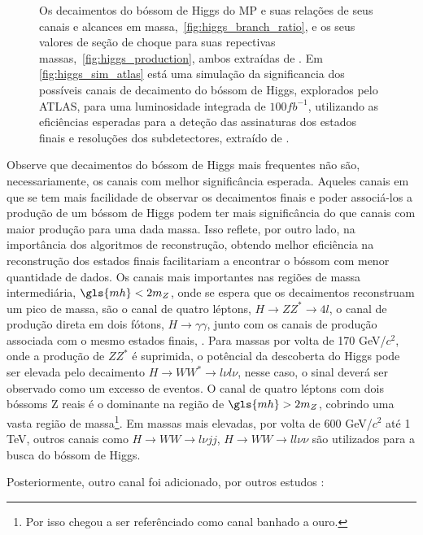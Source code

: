 \begin{figure}[ht!]
\begin{center}
{        }
    \end{center}
\caption[Simulação da significância dos canais de decaimento do bóssom
de Higgs explorados pelos ATLAS, as relações de seus canais e alcances em massa,
e a seção de choque do mesmo.]
{Os decaimentos do bóssom de Higgs do MP e suas relações de
seus canais e alcances em massa,~\ref{fig:higgs_branch_ratio}, e os seus valores de seção de choque para suas
repectivas massas,~\ref{fig:higgs_production}, ambos extraídas de \cite{lhc_higgs_group}. 
Em \ref{fig:higgs_sim_atlas} está uma simulação da significancia dos possíveis canais de decaimento do
bóssom de Higgs, explorados pelo ATLAS, para uma luminosidade integrada de
$100fb^{-1}$, utilizando as eficiências esperadas para a deteção das
assinaturas dos estados finais e resoluções dos subdetectores, extraído de
\cite{ATLAS_TDR2}.}
\end{figure}

Observe que decaimentos do bóssom de Higgs mais frequentes não são,
necessariamente, os canais com melhor significância esperada. Aqueles canais em
que se tem mais facilidade de observar os decaimentos finais e poder associá-los
a produção de um bóssom de Higgs podem ter mais significância do que canais com
maior produção para uma dada massa. Isso reflete, por outro lado, na importância
dos algoritmos de reconstrução, obtendo melhor eficiência na reconstrução dos
estados finais facilitariam a encontrar o bóssom com menor quantidade de dados.
Os canais mais importantes nas regiões de massa intermediária, $\gls{mh}<2m_Z$,
onde se espera que os decaimentos reconstruam um pico de massa, são 
o canal de quatro léptons, $H\rightarrow ZZ^* \rightarrow 4l$, o canal de
produção direta em dois fótons, $H\rightarrow \gamma\gamma$, junto com os
canais de produção associada com o mesmo estados finais, . Para massas por volta
de 170 GeV/$c^2$, onde a produção de $ZZ^*$ é suprimida, o potêncial da descoberta do
Higgs pode ser elevada pelo decaimento $H\rightarrow WW^*\rightarrow l\nu l\nu$,
nesse caso, o sinal deverá ser observado como um excesso de eventos. O canal de
quatro léptons com dois bóssoms Z reais é o dominante na região de
$\gls{mh}>2m_Z$, cobrindo uma vasta região de massa\footnote{Por isso chegou a
ser referênciado como canal banhado a ouro.}. Em massas mais elevadas, por volta de 600 GeV/$c^2$ até 1
TeV, outros canais como $H\rightarrow WW\rightarrow l\nu jj$, $H\rightarrow
WW\rightarrow ll\nu\nu$ são utilizados para a busca do bóssom de Higgs.

Posteriormente, outro canal foi adicionado, por outros estudos
\cite{atlas_tautau,atlas_tautau2}:

